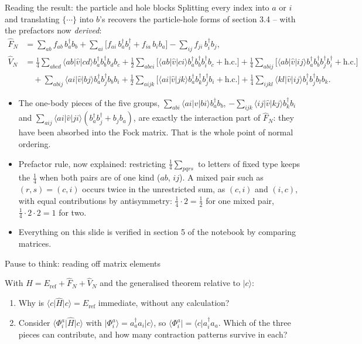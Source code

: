 \documentclass[aspectratio=169,10pt]{beamer}
\newcounter{thinkctr}
\newcommand{\thinkq}[2]{%
  \stepcounter{thinkctr}%
  \begin{tcolorbox}[colback=palewarm,colframe=warm,title={\bfseries Pause to think \#\thethinkctr\hfill\mdseries\small(about #1 min -- discuss with your neighbour)},fonttitle=\bfseries]
  #2
  \end{tcolorbox}}
\newcommand{\ket}[1]{\vert #1\rangle}
\newcommand{\bra}[1]{\langle #1\vert}
\newcommand{\element}[3]{\langle #1\vert #2\vert #3\rangle}
\newcommand{\nc}[1]{\bigl\{#1\bigr\}}
\begin{document}
\begin{frame}{Reading the result: the particle and hole blocks}
  \small
  Splitting every index into $a$ or $i$ and translating $\nc{\cdots}$ into $b$'s recovers the particle-hole forms of section 3.4 -- with the prefactors now \emph{derived}:
  \begin{align*}
    \hat{F}_N&=\sum_{ab}f_{ab}\,b_a^{\dagger}b_b
    +\sum_{ai}\bigl[f_{ai}\,b_a^{\dagger}b_i^{\dagger}+f_{ia}\,b_ib_a\bigr]
    -\sum_{ij}f_{ji}\,b_i^{\dagger}b_j ,\\
    \hat{V}_N&=\tfrac14\sum_{abcd}\element{ab}{\hat{v}}{cd}b_a^{\dagger}b_b^{\dagger}b_db_c
    +\tfrac12\sum_{abci}\bigl[\element{ab}{\hat{v}}{ci}b_a^{\dagger}b_b^{\dagger}b_i^{\dagger}b_c+\mathrm{h.c.}\bigr]
    +\tfrac14\sum_{abij}\bigl[\element{ab}{\hat{v}}{ij}b_a^{\dagger}b_b^{\dagger}b_j^{\dagger}b_i^{\dagger}+\mathrm{h.c.}\bigr]\\
    &\quad+\sum_{abij}\element{ai}{\hat{v}}{bj}b_a^{\dagger}b_j^{\dagger}b_bb_i
    +\tfrac12\sum_{aijk}\bigl[\element{ai}{\hat{v}}{jk}b_a^{\dagger}b_k^{\dagger}b_j^{\dagger}b_i+\mathrm{h.c.}\bigr]
    +\tfrac14\sum_{ijkl}\element{kl}{\hat{v}}{ij}b_i^{\dagger}b_j^{\dagger}b_lb_k .
  \end{align*}
  \begin{itemize}
    \item The one-body pieces of the five groups, $\sum_{abi}\element{ai}{\hat{v}}{bi}b_a^{\dagger}b_b$, $-\sum_{ijk}\element{ij}{\hat{v}}{kj}b_k^{\dagger}b_i$ and $\sum_{aij}\element{ai}{\hat{v}}{ji}(b_a^{\dagger}b_j^{\dagger}+b_jb_a)$, are exactly the interaction part of $\hat{F}_N$: they have been \alert{absorbed into the Fock matrix}. That is the whole point of normal ordering.
    \item Prefactor rule, now explained: restricting $\frac14\sum_{pqrs}$ to letters of fixed type keeps the $\frac14$ when both pairs are of one kind ($ab$, $ij$). A mixed pair such as $(r,s)=(c,i)$ occurs twice in the unrestricted sum, as $(c,i)$ and $(i,c)$, with equal contributions by antisymmetry: $\frac14\cdot2=\frac12$ for one mixed pair, $\frac14\cdot2\cdot2=1$ for two.
    \item Everything on this slide is verified in section 5 of the notebook by comparing matrices.
  \end{itemize}
\end{frame}

\begin{frame}{Pause to think: reading off matrix elements}
  \thinkq{4}{With $\hat{H}=E_{\mathrm{ref}}+\hat{F}_N+\hat{V}_N$ and the generalised theorem relative to $\ket{c}$:
  \begin{enumerate}
    \item Why is $\bra{c}\hat{H}\ket{c}=E_{\mathrm{ref}}$ immediate, without any calculation?
    \item Consider $\bra{\Phi_i^a}\hat{H}\ket{c}$ with $\ket{\Phi_i^a}=a_a^{\dagger}a_i\ket{c}$, so $\bra{\Phi_i^a}=\bra{c}a_i^{\dagger}a_a$. Which of the three pieces can contribute, and how many contraction patterns survive in each?
  \end{enumerate}}
\end{frame}
\end{document}
